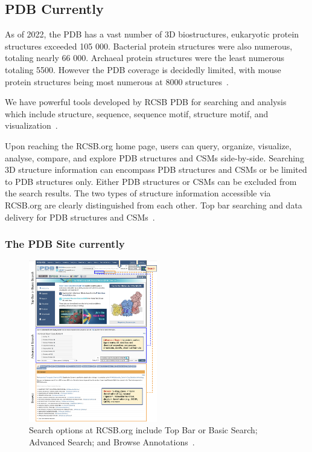 \documentclass{report}
\begin{document}
\subsection{PDB Currently}

As of 2022, the PDB has a vast number of 3D biostructures, eukaryotic protein structures exceeded 105 000. Bacterial protein structures were also numerous, totaling nearly 66 000. Archaeal protein structures were the least numerous totaling 5500. However the PDB coverage is decidedly limited, with mouse protein structures being most numerous at 8000 structures~\cite{burley_open-access_2021}. 

We have powerful tools developed by RCSB PDB for searching and analysis which include structure, sequence, sequence motif, structure motif, and visualization~\cite{burley1_rcsb_2022}.

Upon reaching the RCSB.org home page, users can query, organize, visualize, analyse, compare, and explore PDB structures and CSMs side-by-side. Searching 3D structure information can encompass PDB structures and CSMs or be limited to PDB structures only. Either PDB structures or CSMs can be excluded from the search results. The two types of structure information accessible via RCSB.org are clearly distinguished from each other. Top bar searching and data delivery for PDB structures and CSMs~\cite{burley1_rcsb_2022}.

\subsubsection{The PDB Site currently}

\begin{figure}[H]
    \centering
    \includegraphics[width=0.5\textwidth]{PDB Site.png}
    \caption{\label{fig:PDB}Search options at RCSB.org include Top Bar or Basic Search; Advanced Search; and Browse Annotations~\cite{burley1_rcsb_2022}.}
\end{figure}
\end{document}
